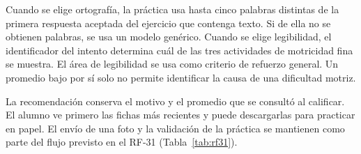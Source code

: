 Cuando se elige ortografía, la práctica usa hasta cinco palabras distintas de la primera respuesta aceptada del ejercicio que contenga texto. Si de ella no se obtienen palabras, se usa un modelo genérico. Cuando se elige legibilidad, el identificador del intento determina cuál de las tres actividades de motricidad fina se muestra. El área de legibilidad se usa como criterio de refuerzo general. Un promedio bajo por sí solo no permite identificar la causa de una dificultad motriz.

La recomendación conserva el motivo y el promedio que se consultó al calificar. El alumno ve primero las fichas más recientes y puede descargarlas para practicar en papel. El envío de una foto y la validación de la práctica se mantienen como parte del flujo previsto en el RF-31 (Tabla~\ref{tab:rf31}).
